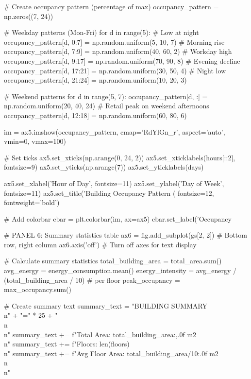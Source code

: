 {    # Create occupancy pattern (percentage of max)
    occupancy_pattern = np.zeros((7, 24))
    
    # Weekday patterns (Mon-Fri)
    for d in range(5):
        # Low at night
        occupancy_pattern[d, 0:7] = np.random.uniform(5, 10, 7)
        # Morning rise
        occupancy_pattern[d, 7:9] = np.random.uniform(40, 60, 2)
        # Workday high
        occupancy_pattern[d, 9:17] = np.random.uniform(70, 90, 8)
        # Evening decline
        occupancy_pattern[d, 17:21] = np.random.uniform(30, 50, 4)
        # Night low
        occupancy_pattern[d, 21:24] = np.random.uniform(10, 20, 3)
    
    # Weekend patterns
    for d in range(5, 7):
        occupancy_pattern[d, :] = np.random.uniform(20, 40, 24)
        # Retail peak on weekend afternoons
        occupancy_pattern[d, 12:18] = np.random.uniform(60, 80, 6)
    
    im = ax5.imshow(occupancy_pattern, cmap='RdYlGn_r', aspect='auto', vmin=0, vmax=100)
    
    # Set ticks
    ax5.set_xticks(np.arange(0, 24, 2))
    ax5.set_xticklabels(hours[::2], fontsize=9)
    ax5.set_yticks(np.arange(7))
    ax5.set_yticklabels(days)
    
    ax5.set_xlabel('Hour of Day', fontsize=11)
    ax5.set_ylabel('Day of Week', fontsize=11)
    ax5.set_title('Building Occupancy Pattern (%
                  fontsize=12, fontweight='bold')
    
    # Add colorbar
    cbar = plt.colorbar(im, ax=ax5)
    cbar.set_label('Occupancy %
    
    # PANEL 6: Summary statistics table
    ax6 = fig.add_subplot(gs[2, 2])  # Bottom row, right column
    ax6.axis('off')  # Turn off axes for text display
    
    # Calculate summary statistics
    total_building_area = total_area.sum()
    avg_energy = energy_consumption.mean()
    energy_intensity = avg_energy / (total_building_area / 10)  # per floor
    peak_occupancy = max_occupancy.sum()
    
    # Create summary text
    summary_text = "BUILDING SUMMARY\\n" + "=" * 25 + "\\n\\n"
    summary_text += f"Total Area: {total_building_area:,.0f} m2\\n"
    summary_text += f"Floors: {len(floors)}\\n"
    summary_text += f"Avg Floor Area: {total_building_area/10:.0f} m2\\n\\n"
    
}
